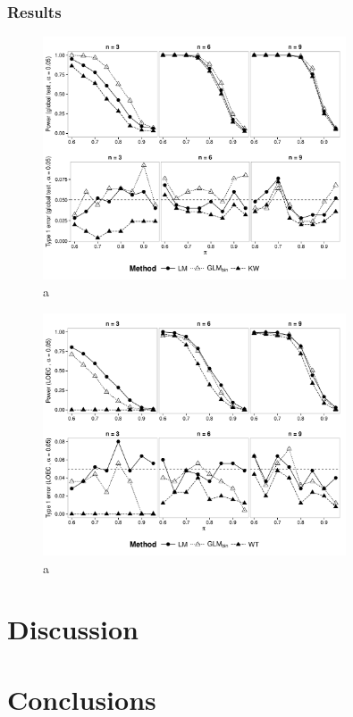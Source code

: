 \documentclass{scrartcl}
\begin{document}
\subsubsection{Results}




\begin{figure}
  \centering
  \includegraphics[width = 0.8\textwidth]{p_glob_p.pdf}
  \caption{a}
  \label{fig:p_glob_p}
\end{figure}

\begin{figure}
  \centering
  \includegraphics[width = 0.8\textwidth]{p_loec_p.pdf}
  \caption{a}
  \label{fig:p_loec_p}
\end{figure}




\section{Discussion}


\section{Conclusions}




\end{document}
